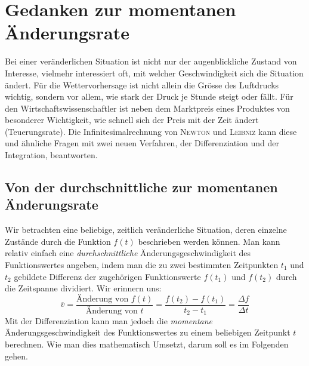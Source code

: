 \documentclass[%
<<<<<<< Updated upstream
11pt,%
twoside,%
titlepage,%
german,%
=======
11pt,%
twoside,%
titlepage,%
swissgerman,%
>>>>>>> Stashed changes
headsepline%
]{scrartcl}
\theoremstyle{definition}
\theoremstyle{plain}
\begin{document}
\clearpage

\section{Gedanken zur momentanen Änderungsrate}
Bei einer veränderlichen Situation ist nicht nur der augenblickliche Zustand von Interesse, vielmehr interessiert oft, mit welcher Geschwindigkeit sich die Situation ändert. Für die Wettervorhersage ist nicht allein die Grösse des Luftdrucks wichtig, sondern vor allem, wie stark der Druck je Stunde steigt oder fällt. Für den Wirtschaftswissenschaftler ist neben dem Marktpreis eines Produktes von besonderer Wichtigkeit, wie schnell sich der Preis mit der Zeit ändert (Teuerungsrate).
Die Infinitesimalrechnung von \textsc{Newton} und \textsc{Leibniz} kann diese und ähnliche Fragen mit zwei neuen Verfahren, der Differenziation und der Integration, beantworten.

\subsection{Von der durchschnittliche zur momentanen Änderungsrate}

Wir betrachten eine beliebige, zeitlich veränderliche Situation, deren einzelne Zustände durch die Funktion $f(t)$
beschrieben werden können. Man kann relativ einfach eine \emph{durchschnittliche} Än\-derungs\-ge\-schwin\-dig\-keit des Funktionswertes angeben, indem man die zu zwei bestimmten Zeitpunkten $t_1$ und $t_2$ gebildete Differenz der zugehörigen Funktionswerte $f(t_1)$ und $f(t_2)$ durch die Zeitspanne dividiert. Wir erinnern uns:
$$\overline{v}=\frac{\text{Änderung von }f(t)}{\text{Änderung von }t}=\frac{f(t_2)-f(t_1)}{t_2-t_1}=\frac{\Delta f}{\Delta t}$$
Mit der Differenziation kann man jedoch die \emph{momentane} Än\-derungs\-ge\-schwin\-dig\-keit des Funktionswertes zu einem beliebigen Zeitpunkt $t$ berechnen. Wie man dies mathematisch Umsetzt, darum soll es im Folgenden gehen.
\end{document}
